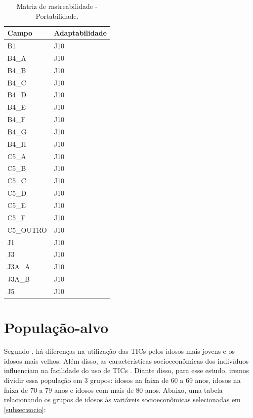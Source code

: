 \begin{table}[h]
\begin{tabular}{|l|l|}
\hline
\textbf{Campo} & \textbf{Adaptabilidade} \\ \hline
B1 & J10 \\ \hline
B4\_A & J10 \\ \hline
B4\_B & J10 \\ \hline
B4\_C & J10 \\ \hline
B4\_D & J10 \\ \hline
B4\_E & J10 \\ \hline
B4\_F & J10 \\ \hline
B4\_G & J10 \\ \hline
B4\_H & J10 \\ \hline
C5\_A & J10 \\ \hline
C5\_B & J10 \\ \hline
C5\_C & J10 \\ \hline
C5\_D & J10 \\ \hline
C5\_E & J10 \\ \hline
C5\_F & J10 \\ \hline
C5\_OUTRO & J10 \\ \hline
J1 & J10 \\ \hline
J3 & J10 \\ \hline
J3A\_A & J10 \\ \hline
J3A\_B & J10 \\ \hline
J5 & J10 \\ \hline
\end{tabular}

\caption{Matriz de rastreabilidade - Portabilidade.}
\end{table}

\newpage

\section{População-alvo}

Segundo , há diferenças na utilização das TICs pelos idosos mais jovens e os idosos mais velhos. Além disso, as características socioeconômicas dos indivíduos influenciam na facilidade do uso de TICs . Diante disso, para esse estudo, iremos dividir essa população em 3 grupos: idosos na faixa de 60 a 69 anos, idosos na faixa de 70 a 79 anos e idosos com mais de 80 anos. Abaixo, uma tabela relacionando os grupos de idosos às variáveis socioeconômicas selecionadas em \ref{subsec:socio}:

